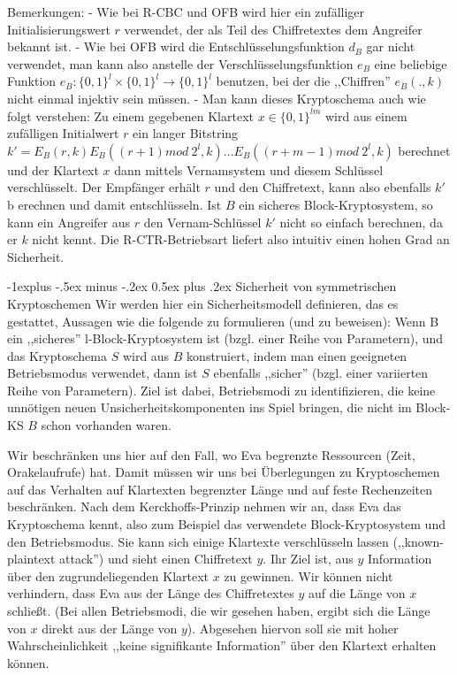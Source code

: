 \documentclass[a4paper]{article}
\makeatletter
\renewcommand{\subsection}{\@startsection{subsection}{2}{0mm}%
 {-1explus -.5ex minus -.2ex}%
 {0.5ex plus .2ex}%
 {\normalfont\normalsize\bfseries}}
\makeatother
\begin{document}
\begin{multicols}{3}
    Bemerkungen:
    - Wie bei R-CBC und OFB wird hier ein zufälliger Initialisierungswert $r$ verwendet, der als Teil des Chiffretextes dem Angreifer bekannt ist.
    - Wie bei OFB wird die Entschlüsselungsfunktion $d_B$ gar nicht verwendet, man kann also anstelle der Verschlüsselungsfunktion $e_B$ eine beliebige Funktion $e_B:\{0,1\}^l\times\{0,1\}^l\rightarrow\{0,1\}^l$ benutzen, bei der die ,,Chiffren'' $e_B(.,k)$ nicht einmal injektiv sein müssen.
    - Man kann dieses Kryptoschema auch wie folgt verstehen: Zu einem gegebenen Klartext $x\in\{0,1\}^{lm}$ wird aus einem zufälligen Initialwert $r$ ein langer Bitstring $k'=E_B(r,k) E_B((r+1) mod\ 2^l,k)... E_B((r+m-1) mod\ 2^l,k)$ berechnet und der Klartext $x$ dann mittels Vernamsystem und diesem Schlüssel verschlüsselt. Der Empfänger erhält $r$ und den Chiffretext, kann also ebenfalls $k'$ b erechnen und damit entschlüsseln. Ist $B$ ein sicheres Block-Kryptosystem, so kann ein Angreifer aus $r$ den Vernam-Schlüssel $k'$ nicht so einfach berechnen, da er $k$ nicht kennt. Die R-CTR-Betriebsart liefert also intuitiv einen hohen Grad an Sicherheit.

    \subsection{Sicherheit von symmetrischen Kryptoschemen}
    Wir werden hier ein Sicherheitsmodell definieren, das es gestattet, Aussagen wie die folgende zu formulieren (und zu beweisen): Wenn B ein ,,sicheres'' l-Block-Kryptosystem ist (bzgl. einer Reihe von Parametern), und das Kryptoschema $S$ wird aus $B$ konstruiert, indem man einen geeigneten Betriebsmodus verwendet, dann ist $S$ ebenfalls ,,sicher'' (bzgl. einer variierten Reihe von Parametern). Ziel ist dabei, Betriebsmodi zu identifizieren, die keine unnötigen neuen Unsicherheitskomponenten ins Spiel bringen, die nicht im Block-KS
    $B$ schon vorhanden waren.

    Wir beschränken uns hier auf den Fall, wo Eva begrenzte Ressourcen (Zeit, Orakelaufrufe) hat. Damit müssen wir uns bei Überlegungen zu Kryptoschemen auf das Verhalten auf Klartexten begrenzter Länge und auf feste Rechenzeiten beschränken. Nach dem Kerckhoffs-Prinzip nehmen wir an, dass Eva das Kryptoschema kennt, also zum Beispiel das verwendete Block-Kryptosystem und den Betriebsmodus. Sie kann sich einige Klartexte verschlüsseln lassen (,,known-plaintext attack'') und sieht einen Chiffretext $y$. Ihr Ziel ist, aus $y$ Information über den zugrundeliegenden Klartext $x$ zu gewinnen. Wir können nicht verhindern, dass Eva aus der Länge des Chiffretextes $y$ auf die Länge von $x$ schließt. (Bei allen Betriebsmodi, die wir gesehen haben, ergibt sich die Länge von $x$ direkt aus der Länge von $y$). Abgesehen hiervon soll sie mit hoher Wahrscheinlichkeit ,,keine signifikante Information'' über den Klartext erhalten können.


\end{multicols}
\end{document}
